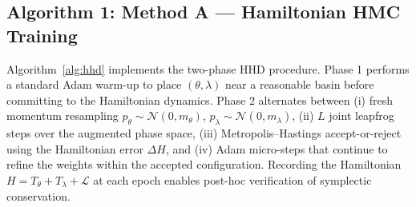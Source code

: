 \documentclass[12pt,a4paper]{article}
\begin{document}
\subsection{Algorithm 1: Method A — Hamiltonian HMC Training}
Algorithm~\ref{alg:hhd} implements the two-phase HHD procedure.
Phase 1 performs a standard Adam warm-up to place $(\theta, \lambda)$
near a reasonable basin before committing to the Hamiltonian dynamics.
Phase 2 alternates between (i) fresh momentum resampling
$p_\theta \sim \mathcal{N}(0, m_\theta)$,
$p_\lambda \sim \mathcal{N}(0, m_\lambda)$,
(ii) $L$ joint leapfrog steps over the augmented phase space, (iii)
Metropolis--Hastings accept-or-reject using the Hamiltonian error
$\Delta H$, and (iv) Adam micro-steps that continue to refine the
weights within the accepted configuration.  Recording the
Hamiltonian $H = T_\theta + T_\lambda + \mathcal{L}$ at each epoch
enables post-hoc verification of symplectic conservation.
\end{document}
